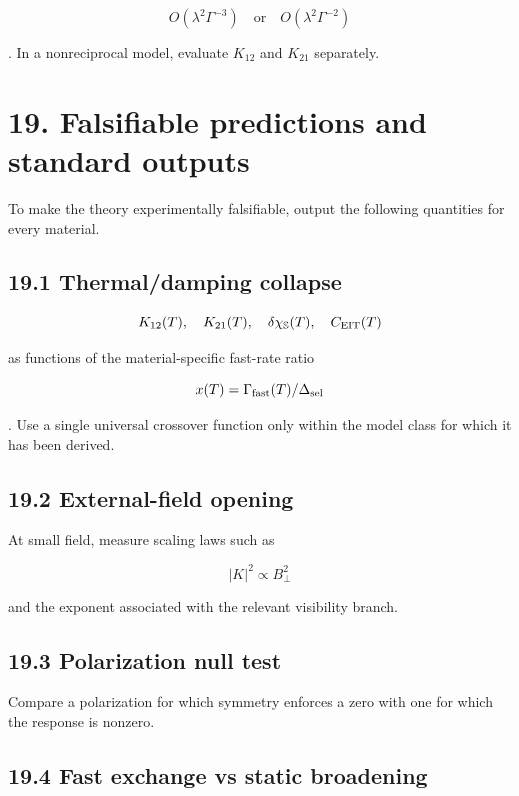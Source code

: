 \documentclass[
  10pt,
  a4paper,
]{article}
\begin{document}
\[
O(\lambda^2\Gamma^{-3})
\quad\text{or}\quad
O(\lambda^2\Gamma^{-2})
\]

. In a nonreciprocal model, evaluate \(K_{12}\) and \(K_{21}\)
separately.

\section{19. Falsifiable predictions and standard
outputs}\label{falsifiable-predictions-and-standard-outputs}

To make the theory experimentally falsifiable, output the following
quantities for every material.

\subsection{19.1 Thermal/damping
collapse}\label{thermaldamping-collapse}

\[
K_{12}(T),\quad K_{21}(T),\quad
\delta\chi_{\mathbb S}(T),\quad C_{\rm EIT}(T)
\]

as functions of the material-specific fast-rate ratio

\[
x(T)=\Gamma_{\rm fast}(T)/\Delta_{\rm sel}
\]

. Use a single universal crossover function only within the model class
for which it has been derived.

\subsection{19.2 External-field opening}\label{external-field-opening}

At small field, measure scaling laws such as

\[
|K|^2\propto B_\perp^2
\]

and the exponent associated with the relevant visibility branch.

\subsection{19.3 Polarization null test}\label{polarization-null-test}

Compare a polarization for which symmetry enforces a zero with one for
which the response is nonzero.

\subsection{19.4 Fast exchange vs static
broadening}\label{fast-exchange-vs-static-broadening}
\end{document}
